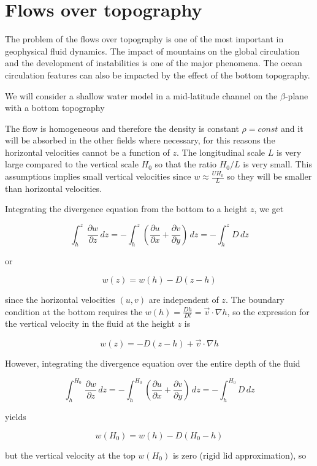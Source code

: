 \section{Flows over topography}\label{flows-over-topography}

The problem of the flows over topography is one of the most important in
geophysical fluid dynamics. The impact of mountains on the global
circulation and the development of instabilities is one of the major
phenomena. The ocean circulation features can also be impacted by the
effect of the bottom topography.

We will consider a shallow water model in a mid-latitude channel on the
\(\beta\)-plane with a bottom topography

The flow is homogeneous and therefore the density is constant
\(\rho = const\) and it will be absorbed in the other fields where
necessary, for this reasons the horizontal velocities cannot be a
function of \(z\). The longitudinal scale \(L\) is very large compared
to the vertical scale \(H_0\) so that the ratio \(H_0/L\) is very small.
This assumptions implies small vertical velocities since
\(w \approx \frac{U H_0}{L}\) so they will be smaller than horizontal
velocities.

Integrating the divergence equation from the bottom to a height \(z\),
we get

\[\int_h^z \, \frac{\partial w}{\partial z} \, dz = - \int_h^z \left( \frac{\partial u}{\partial x}+\frac{\partial v}{\partial y}\right) \, dz= - \int_h^z D \, dz\]

or

\[w(z) = w(h) - D(z-h)\]

since the horizontal velocities \((u,v)\) are independent of \(z\). The
boundary condition at the bottom requires the
\(w(h) = \frac{D h}{Dt} = \vec{v}\cdot\nabla h\), so the expression for
the vertical velocity in the fluid at the height \(z\) is

{\[w(z) =  - D(z-h)+\vec{v}\cdot\nabla h\]}

However, integrating the divergence equation over the entire depth of
the fluid

\[\int_h^{H_0} \, \frac{\partial w}{\partial z} \, dz = - \int_h^{H_0} \left( \frac{\partial u}{\partial x}+\frac{\partial v}{\partial y}\right) \, dz= - \int_h^{H_0} D \, dz\]

yields

\[w(H_0) = w(h) - D(H_0-h)\]

but the vertical velocity at the top \(w(H_0)\) is zero (rigid lid
approximation), so

